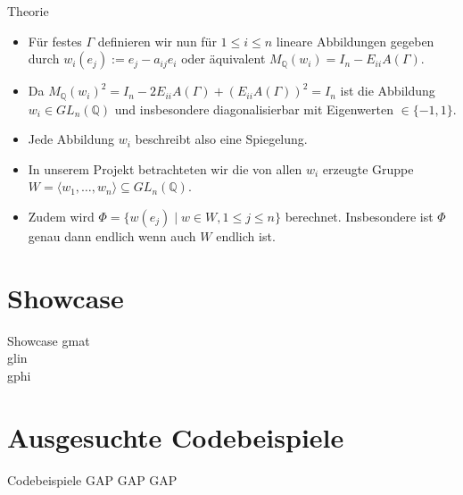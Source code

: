 \documentclass[9pt]{beamer}
\begin{document}
\begin{frame}{Theorie}
\begin{itemize}
\item Für festes $\Gamma$ definieren wir nun für $1 \leq i \leq n$ lineare Abbildungen gegeben durch $w_i(e_j) := e_j - a_{ij}e_i$ oder äquivalent $M_{\mathbb Q}(w_i) = I_n - E_{ii}A(\Gamma)$.
\item Da $M_{\mathbb Q}(w_i)^2 = I_n - 2E_{ii}A(\Gamma) + (E_{ii}A(\Gamma))^2 = I_n$ ist die Abbildung $w_i \in GL_n(\mathbb Q)$ und insbesondere diagonalisierbar mit Eigenwerten $\in \{-1,1\}$.
\item Jede Abbildung $w_i$ beschreibt also eine Spiegelung.
\item In unserem Projekt betrachteten wir die von allen $w_i$ erzeugte Gruppe $W = \langle w_1, \ldots, w_n \rangle \subseteq GL_n(\mathbb Q)$.
\item Zudem wird $\Phi = \{w(e_j) \mid w \in W, 1 \leq j \leq n\}$ berechnet. Insbesondere ist $\Phi$ genau dann endlich wenn auch $W$ endlich ist.
\end{itemize}
\end{frame}



\section{Showcase}
\begin{frame}{Showcase}
gmat\\
glin\\
gphi\\
\end{frame}
\section{Ausgesuchte Codebeispiele}
\begin{frame}{Codebeispiele}
GAP GAP GAP
\end{frame}
\end{document}

